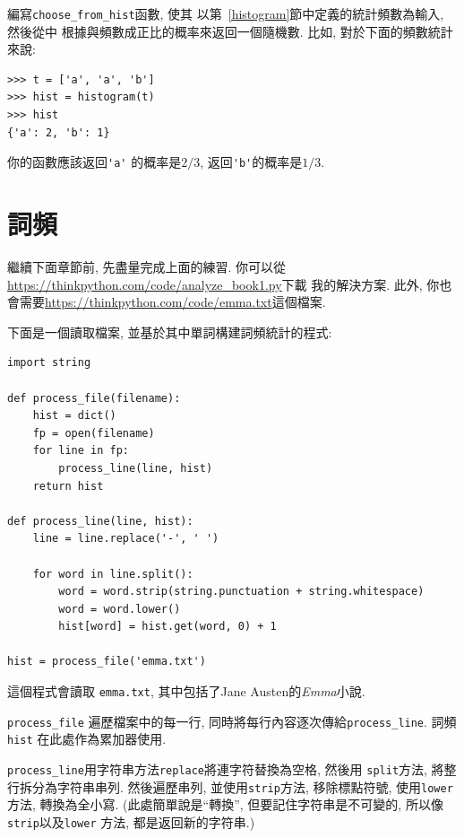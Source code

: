 \documentclass[10pt]{book}
\begin{document}
\begin{exercise}

編寫\verb"choose_from_hist"函數, 使其
以第~\ref{histogram}節中定義的統計頻數為輸入, 然後從中
根據與頻數成正比的概率來返回一個隨機數. 
比如, 對於下面的頻數統計來說:

\begin{verbatim}
>>> t = ['a', 'a', 'b']
>>> hist = histogram(t)
>>> hist
{'a': 2, 'b': 1}
\end{verbatim}
%
你的函數應該返回\verb"'a'" 的概率是$2/3$,  返回\verb"'b'"的概率是$1/3$.
\end{exercise}


\section{詞頻}

繼續下面章節前, 先盡量完成上面的練習. 
你可以從 \url{https://thinkpython.com/code/analyze_book1.py}下載
我的解決方案. 此外, 你也會需要\url{https://thinkpython.com/code/emma.txt}這個檔案.

下面是一個讀取檔案, 並基於其中單詞構建詞頻統計的程式:

\begin{verbatim}
import string

def process_file(filename):
    hist = dict()
    fp = open(filename)
    for line in fp:
        process_line(line, hist)
    return hist

def process_line(line, hist):
    line = line.replace('-', ' ')
    
    for word in line.split():
        word = word.strip(string.punctuation + string.whitespace)
        word = word.lower()
        hist[word] = hist.get(word, 0) + 1

hist = process_file('emma.txt')
\end{verbatim}
%
這個程式會讀取 {\tt emma.txt}, 其中包括了Jane Austen的{\em Emma}小說. 

\verb"process_file" 遍歷檔案中的每一行, 同時將每行內容逐次傳給\verb"process_line". 
詞頻{\tt hist} 在此處作為累加器使用. 

\verb"process_line"用字符串方法{\tt replace}將連字符替換為空格, 然後用
 {\tt split}方法, 將整行拆分為字符串串列. 
然後遍歷串列, 並使用{\tt strip}方法, 移除標點符號, 使用{\tt lower}方法, 
轉換為全小寫. (此處簡單說是``轉換'', 但要記住字符串是不可變的, 所以像
{\tt strip}以及{\tt lower} 方法, 都是返回新的字符串.)
\end{document}

